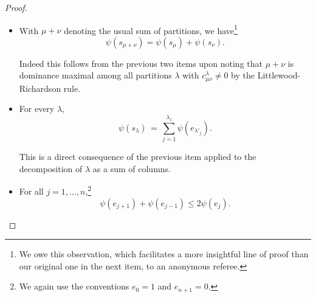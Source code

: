 \documentclass[11pt]{article}
\theoremstyle{definition}
\numberwithin{equation}{section}
\begin{document}
\begin{proof}
\begin{itemize}
			To see this, we can assume without loss of generality that $\mu$ is obtained from $\nu$ by moving a single box from row $i$ down to row $j > i$, meaning that $\mu$ and $\nu$ coincide in all rows apart from
			\[
				\mu_i = \nu_i - 1, \qquad \mu_j = \nu_j + 1,
			\]
			and $j = i + 1$ (box moves down by one row and left by any number of columns) or $\mu_i = \mu_j$ (box moves left by one column and down any number of rows)~\cite[Proposition~2.3]{brylawski}.
			Then any way of adding at least $m \coloneqq \sum_{k < \nu_i} (n - \nu'_k)$ boxes to $\mu$ so as to obtain a new partition necessarily also adds the extra box at $(i, \nu_i)$.
			By repeated application of the Pieri rule, it follows that every Schur polynomial that occurs in the expansion of $s_\mu e_1^m$ also occurs in the expansion of $s_\nu e_1^m$.
			Applying $\psi$ to this statement gives
			\[
				\psi(s_\mu) + m \psi(e_1) \,\le\, \psi(s_\nu) + m \psi(e_1),
			\]
			and hence also the desired $\psi(s_\mu) \le \psi(s_\nu)$.
		\item With $\mu + \nu$ denoting the usual sum of partitions, we have\footnote{We owe this observation, which facilitates a more insightful line of proof than our original one in the next item, to an anonymous referee.}
			\[
				\psi(s_{\mu + \nu}) = \psi(s_\mu) + \psi(s_\nu).
			\]

			Indeed this follows from the previous two items upon noting that $\mu + \nu$ is dominance maximal among all partitions $\lambda$ with $c^{\lambda}_{\mu\nu} \neq 0$ by the Littlewood-Richardson rule.
		\item For every $\lambda$,
			\begin{equation}
				\label{psi_se}
				\psi(s_\lambda) \,=\, \sum_{j=1}^{\lambda_1} \psi(e_{\lambda'_j}).
			\end{equation}

			This is a direct consequence of the previous item applied to the decomposition of $\lambda$ as a sum of columns.
		\item For all $j = 1, \ldots, n$,\footnote{We again use the conventions $e_0 = 1$ and $e_{n+1} = 0$.}
			\begin{equation}
				\label{submod}
				\psi(e_{j+1}) + \psi(e_{j-1}) \le 2 \psi(e_j).
			\end{equation}
			

\end{itemize}
\end{proof}
\end{document}
